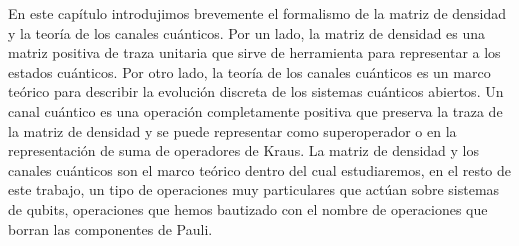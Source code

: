En este capítulo introdujimos brevemente 
el formalismo de la matriz de densidad
y la teoría de los canales cuánticos. Por un lado, la matriz de densidad es una 
matriz positiva de traza unitaria que sirve de herramienta para 
representar a los estados cuánticos. 
Por otro lado, la teoría de los canales cuánticos es un marco teórico 
para describir la evolución discreta de los sistemas cuánticos abiertos. 
Un canal cuántico es una operación completamente positiva que 
preserva la traza de la matriz de densidad y se puede representar 
como superoperador o en la representación de 
suma de operadores de Kraus. La matriz de densidad y los canales 
cuánticos son el marco teórico dentro del cual estudiaremos, en 
el resto de este trabajo, un tipo de operaciones muy particulares 
que actúan sobre sistemas de qubits, operaciones que hemos bautizado 
con el nombre de operaciones que borran las componentes de Pauli.


